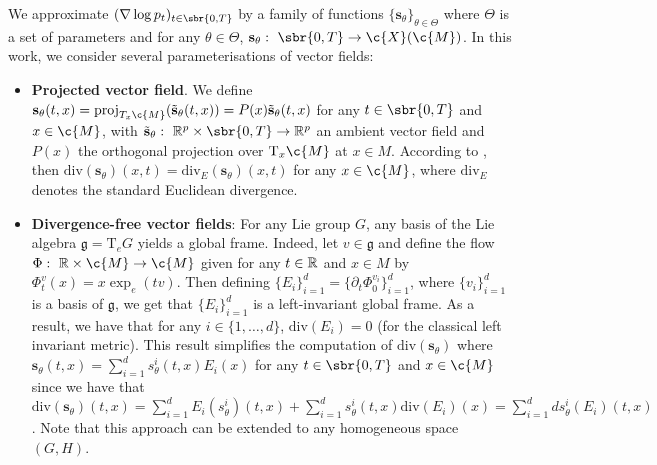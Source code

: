 We approximate $(\nabla \log p_t)_{t \in \sbr{0,T}}$ by a family of functions $\{\mathbf{s}_\theta\}_{\theta \in \Theta}$ where $\Theta$ is a set of parameters and for any $\theta \in \Theta$, $\mathbf{s}_\theta: \ \sbr{0,T} \to \c{X}(\c{M})$.
In this work, we consider several parameterisations of vector fields: \begin{itemize}[wide] \item \textbf{Projected vector field}.
	      We define $\mathbf{s}_\theta(t, x) = \text{proj}_{T_{x}\c{M}}(\tilde{\mathbf{s}}_\theta(t, x)) = P(x) \tilde{\mathbf{s}}_\theta(t, x) $ for any $t \in \sbr{0,T}$ and $x \in \c{M}$, with $\tilde{\mathbf{s}}_\theta: \ \R^p \times \sbr{0,T} \to \R^p$ an ambient vector field and $P(x)$ the orthogonal projection over $\mathrm{T}_x\c{M}$ at $x \in M$.
	      According to \textcite[Lemma 2]{rozen2021moser}, then $\mathrm{div}(\mathbf{s}_\theta)(x,t) = \mathrm{div}_E(\mathbf{s}_\theta)(x,t)$ for any $x \in \c{M}$, where $\mathrm{div}_E$ denotes the standard Euclidean divergence.

	\item \textbf{Divergence-free vector fields}: For any Lie group $G$, any basis
	      of the Lie algebra $\mathfrak{g} = \mathrm{T}_e G$ yields a global
	      frame.
	      Indeed, let $v \in \mathfrak{g}$ and define the flow $\Phi: \ \R \times \c{M} \to \c{M}$ given for any $t \in \mathbb{R}$ and $x \in M$ by $\Phi_t^v(x) = x \exp_e(t v)$.
	      Then defining $\{E_i\}_{i=1}^d = \{\partial_t \Phi_0^{v_i}\}_{i=1}^d$, where $\{v_i\}_{i=1}^d$ is a basis of $\mathfrak{g}$, we get that $\{E_i\}_{i=1}^d$ is a left-invariant global frame.
	      As a result, we have that for any $i \in \{1, \dots, d\}$, $\mathrm{div}(E_i)=0$ (for the classical left invariant metric).
	      This result simplifies the computation of $\mathrm{div}(\mathbf{s}_\theta)$ where $\mathbf{s}_\theta(t,x) = \sum_{i=1}^d {s}^i_\theta(t,x) E_i(x)$ for any $t \in \sbr{0,T}$ and $x \in \c{M}$ since we have that $\mathrm{div}(\mathbf{s}_\theta)(t, x) = \sum_{i=1}^d E_i({s}^i_\theta)(t, x) + \sum_{i=1}^d {s}^i_\theta(t,x) \mathrm{div}(E_i)(x) = \sum_{i=1}^d d{s}^i_\theta (E_i)(t, x) $ \cite[see][]{falorsi2020neural}.
	      Note that this approach can be extended to any homogeneous space $(G,H)$.


\end{itemize}
